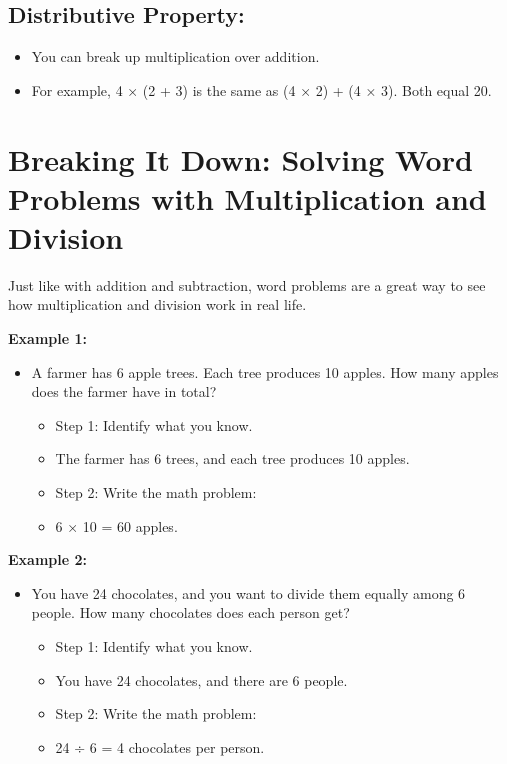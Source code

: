 \subsection{Distributive Property:}
\begin{itemize}
    \item You can break up multiplication over addition.
    \item For example, 4 × (2 + 3) is the same as (4 × 2) + (4 × 3). Both equal 20.
\end{itemize}

\section{Breaking It Down: Solving Word Problems with Multiplication and Division}
Just like with addition and subtraction, word problems are a great way to see how multiplication and division work in real life.

\textbf{Example 1:}
\begin{itemize}
    \item A farmer has 6 apple trees. Each tree produces 10 apples. How many apples does the farmer have in total?
    \begin{itemize}
        \item Step 1: Identify what you know.
        \item The farmer has 6 trees, and each tree produces 10 apples.
        \item Step 2: Write the math problem:
        \item 6 × 10 = 60 apples.
    \end{itemize}
\end{itemize}

\textbf{Example 2:}
\begin{itemize}
    \item You have 24 chocolates, and you want to divide them equally among 6 people. How many chocolates does each person get?
    \begin{itemize}
        \item Step 1: Identify what you know.
        \item You have 24 chocolates, and there are 6 people.
        \item Step 2: Write the math problem:
        \item 24 ÷ 6 = 4 chocolates per person.
    \end{itemize}
\end{itemize}


